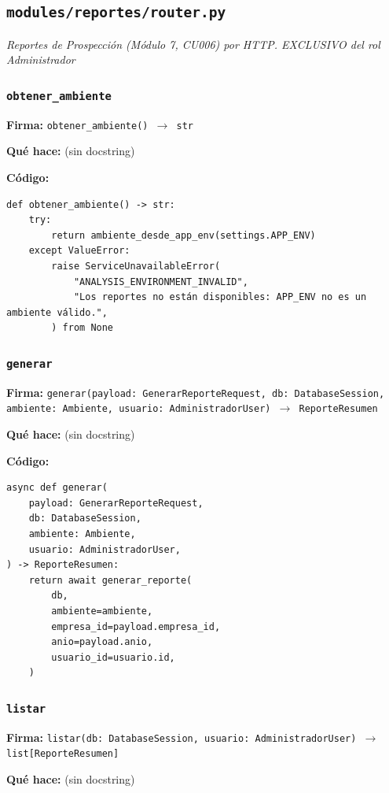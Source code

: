 \documentclass[11pt,a4paper]{article}
\begin{document}
\subsection{\texttt{modules/reportes/router.py}}
\textit{Reportes de Prospección (Módulo 7, CU006) por HTTP. EXCLUSIVO del rol Administrador}

\subsubsection*{\texttt{obtener\_ambiente}}
\textbf{Firma:} \texttt{obtener\_ambiente() $\rightarrow$ str}

\textbf{Qué hace:} (sin docstring)

\textbf{Código:}
\begin{lstlisting}
def obtener_ambiente() -> str:
    try:
        return ambiente_desde_app_env(settings.APP_ENV)
    except ValueError:
        raise ServiceUnavailableError(
            "ANALYSIS_ENVIRONMENT_INVALID",
            "Los reportes no están disponibles: APP_ENV no es un ambiente válido.",
        ) from None
\end{lstlisting}

\subsubsection*{\texttt{generar}}
\textbf{Firma:} \texttt{generar(payload: GenerarReporteRequest, db: DatabaseSession, ambiente: Ambiente, usuario: AdministradorUser) $\rightarrow$ ReporteResumen}

\textbf{Qué hace:} (sin docstring)

\textbf{Código:}
\begin{lstlisting}
async def generar(
    payload: GenerarReporteRequest,
    db: DatabaseSession,
    ambiente: Ambiente,
    usuario: AdministradorUser,
) -> ReporteResumen:
    return await generar_reporte(
        db,
        ambiente=ambiente,
        empresa_id=payload.empresa_id,
        anio=payload.anio,
        usuario_id=usuario.id,
    )
\end{lstlisting}

\subsubsection*{\texttt{listar}}
\textbf{Firma:} \texttt{listar(db: DatabaseSession, usuario: AdministradorUser) $\rightarrow$ list[ReporteResumen]}

\textbf{Qué hace:} (sin docstring)
\end{document}
